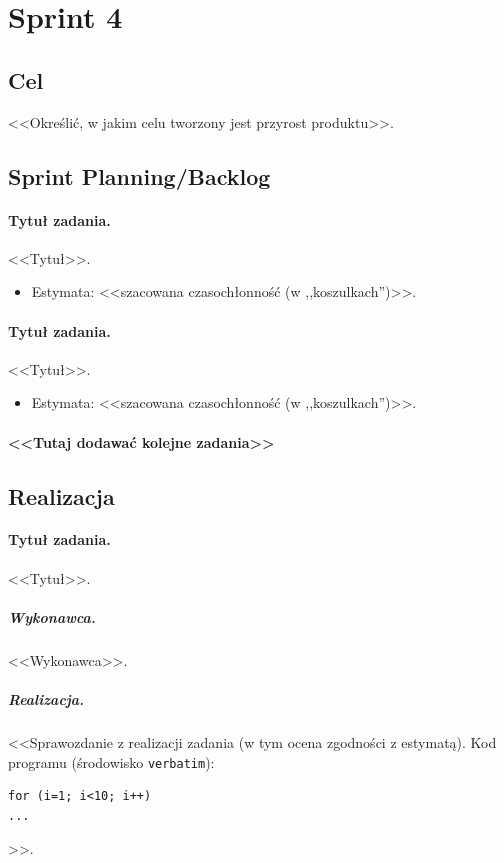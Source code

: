 \documentclass[a4paper]{article}
\begin{document}
\section{Sprint 4}

\subsection{Cel} <<Określić, w jakim celu tworzony jest przyrost produktu>>.

\subsection{Sprint Planning/Backlog}

\paragraph{Tytuł zadania.} <<Tytuł>>.
\begin{itemize}
	\item Estymata: <<szacowana czasochłonność (w ,,koszulkach'')>>.
\end{itemize}

\paragraph{Tytuł zadania.} <<Tytuł>>.
\begin{itemize}
	\item Estymata: <<szacowana czasochłonność (w ,,koszulkach'')>>.
\end{itemize}

\paragraph{<<Tutaj dodawać kolejne zadania>>}

\subsection{Realizacja}

\paragraph{Tytuł zadania.} <<Tytuł>>.
\subparagraph{Wykonawca.} <<Wykonawca>>.
\subparagraph{Realizacja.} <<Sprawozdanie z realizacji zadania (w tym ocena zgodności z estymatą). Kod programu (środowisko \texttt{verbatim}): \begin{verbatim}
for (i=1; i<10; i++)
...
\end{verbatim}>>.
\end{document}
